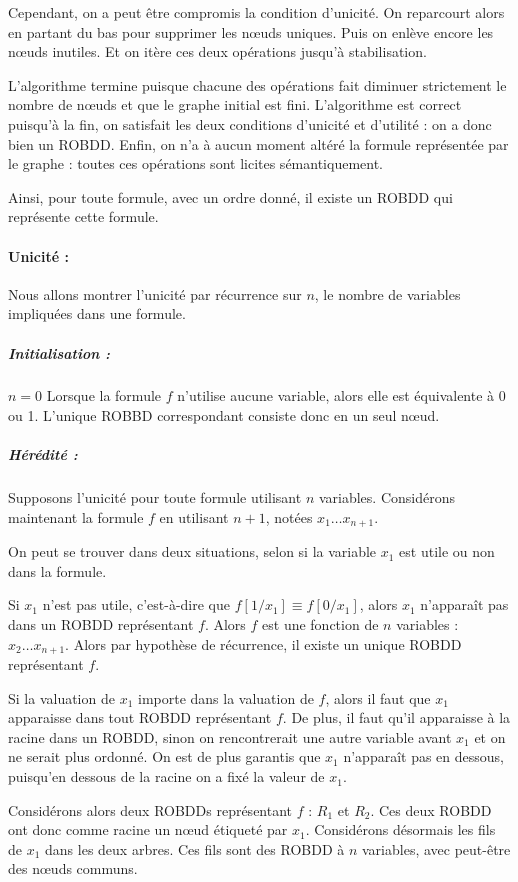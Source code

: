 \documentclass[12pt]{article}
\begin{document}
Cependant, on a peut être compromis la condition d'unicité. On reparcourt alors en partant du bas pour supprimer les n\oe uds uniques. Puis on enlève encore les n\oe uds inutiles. Et on itère ces deux opérations jusqu'à stabilisation.

L'algorithme termine puisque chacune des opérations fait diminuer strictement le nombre de n\oe uds et que le graphe initial est fini.
L'algorithme est correct puisqu'à la fin, on satisfait les deux conditions d'unicité et d'utilité : on a donc bien un ROBDD. Enfin, on n'a à aucun moment altéré la formule représentée par le graphe : toutes ces opérations sont licites sémantiquement. %

Ainsi, pour toute formule, avec un ordre donné, il existe un ROBDD qui représente cette formule.

\paragraph{Unicité :}
Nous allons montrer l'unicité par récurrence sur $n$, le nombre de variables impliquées dans une formule.

\subparagraph{Initialisation :}
$n = 0$ Lorsque la formule $f$ n'utilise aucune variable, alors elle est équivalente à 0 ou 1. L'unique ROBBD correspondant consiste donc en un seul n\oe ud.

\subparagraph{Hérédité :}
Supposons l'unicité pour toute formule utilisant $n$ variables. Considérons maintenant la formule $f$ en utilisant $n+1$, notées $x_1\dots x_{n+1}$.

On peut se trouver dans deux situations, selon si la variable $x_1$ est utile ou non dans la formule.

Si $x_1$ n'est pas utile, c'est-à-dire que $f[1/x_1]\equiv f[0/x_1]$, alors $x_1$ n'apparaît pas dans un ROBDD représentant $f$. Alors $f$ est une fonction de $n$ variables : $x_2\dots x_{n+1}$. Alors par hypothèse de récurrence, il existe un unique ROBDD représentant $f$.

Si la valuation de $x_1$ importe dans la valuation de $f$, alors il faut que $x_1$ apparaisse dans tout ROBDD représentant $f$. De plus, il faut qu'il apparaisse à la racine dans un ROBDD, sinon on rencontrerait une autre variable avant $x_1$ et on ne serait plus ordonné. On est de plus garantis que $x_1$ n'apparaît pas en dessous, puisqu'en dessous de la racine on a fixé la valeur de $x_1$.

Considérons alors deux ROBDDs représentant $f$ : $R_1$ et $R_2$. Ces deux ROBDD ont donc comme racine un n\oe ud étiqueté par $x_1$. Considérons désormais les fils de $x_1$ dans les deux arbres. Ces fils sont des ROBDD à $n$ variables, avec peut-être des n\oe uds communs.
\end{document}

